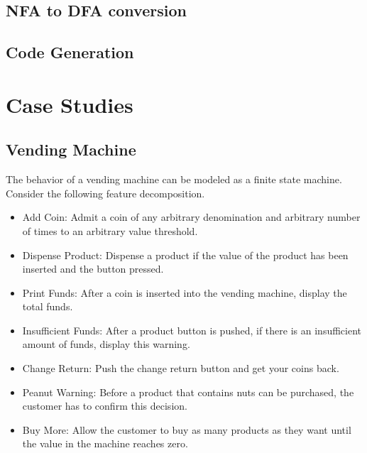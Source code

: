 \documentclass[sigplan,anonymous,review]{acmart}
\begin{document}
\subsection{NFA to DFA conversion}
\subsection{Code Generation}

\section{Case Studies}
\subsection{Vending Machine}\label{sec:vend}
The behavior of a vending machine can be modeled as a finite state machine. Consider the following feature decomposition.
\begin{itemize}
    \item Add Coin: Admit a coin of any arbitrary denomination and arbitrary number of times to an arbitrary value threshold.
    \item Dispense Product: Dispense a product if the value of the product has been inserted and the button pressed.
    \item Print Funds: After a coin is inserted into the vending machine, display the total funds.
    \item Insufficient Funds: After a product button is pushed, if there is an insufficient amount of funds, display this warning.
    \item Change Return: Push the change return button and get your coins back.
    \item Peanut Warning: Before a product that contains nuts can be purchased, the customer has to confirm this decision.
    \item Buy More: Allow the customer to buy as many products as they want until the value in the machine reaches zero.
\end{itemize}
\end{document}
